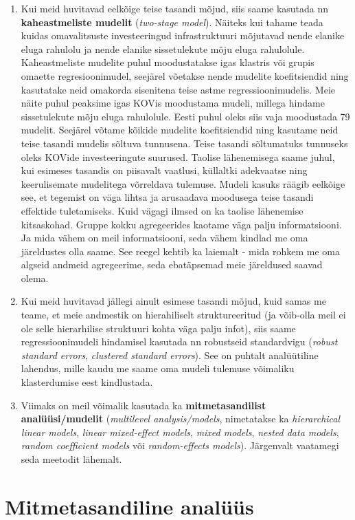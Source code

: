\documentclass[
]{book}
\begin{document}
\begin{enumerate}
\item
  Kui meid huvitavad eelkõige teise tasandi mõjud, siis saame kasutada nn \textbf{kaheastmeliste mudelit} (\emph{two-stage model}). Näiteks kui tahame teada kuidas omavalitsuste investeeringud infrastruktuuri mõjutavad nende elanike eluga rahulolu ja nende elanike sissetulekute mõju eluga rahulolule. Kaheastmeliste mudelite puhul moodustatakse igas klastris või grupis omaette regresioonimudel, seejärel võetakse nende mudelite koefitsiendid ning kasutatake neid omakorda sisenitena teise astme regressioonimudelis. Meie näite puhul peaksime igas KOVis moodustama mudeli, millega hindame sissetulekute mõju eluga rahulolule. Eesti puhul oleks siis vaja moodustada 79 mudelit. Seejärel võtame kõikide mudelite koefitsiendid ning kasutame neid teise tasandi mudelis sõltuva tunnusena. Teise tasandi sõltumatuks tunnuseks oleks KOVide investeeringute suurused. Taolise lähenemisega saame juhul, kui esimeses tasandis on piisavalt vaatlusi, küllaltki adekvaatse ning keerulisemate mudelitega võrreldava tulemuse. Mudeli kasuks räägib eelkõige see, et tegemist on väga lihtsa ja arusaadava moodusega teise tasandi effektide tuletamiseks. Kuid vägagi ilmsed on ka taolise lähenemise kitsaskohad. Gruppe kokku agregeerides kaotame väga palju informatsiooni. Ja mida vähem on meil informatsiooni, seda vähem kindlad me oma järeldustes olla saame. See reegel kehtib ka laiemalt - mida rohkem me oma algseid andmeid agregeerime, seda ebatäpsemad meie järeldused saavad olema.
\item
  Kui meid huvitavad jällegi ainult esimese tasandi mõjud, kuid samas me teame, et meie andmestik on hierahiliselt struktureeritud (ja võib-olla meil ei ole selle hierarhilise struktuuri kohta väga palju infot), siis saame regressioonimudeli hindamisel kasutada nn robustseid standardvigu (\emph{robust standard errors}, \emph{clustered standard errors}). See on puhtalt analüütiline lahendus, mille kaudu me saame oma mudeli tulemuse võimaliku klasterdumise eest kindlustada.
\item
  Viimaks on meil võimalik kasutada ka \textbf{mitmetasandilist analüüsi/mudelit} (\emph{multilevel analysis/models}, nimetatakse ka \emph{hierarchical linear models}, \emph{linear mixed-effect models}, \emph{mixed models}, \emph{nested data models}, \emph{random coefficient models} või \emph{random-effects models}). Järgenvalt vaatamegi seda meetodit lähemalt.
\end{enumerate}

\hypertarget{mitmetasandiline-analuxfcuxfcs}{%
\section{Mitmetasandiline analüüs}\label{mitmetasandiline-analuxfcuxfcs}}
\end{document}
